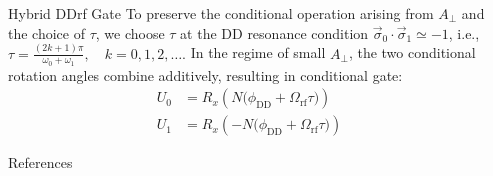 \documentclass[final]{beamer}
\newlength{\sepwidth}
\newlength{\colwidth}
\newcommand{\separatorcolumn}{\begin{column}{\sepwidth}\end{column}}
\begin{document}
\begin{frame}[t]
\begin{columns}[t]
\begin{column}{\colwidth}
\begin{block}{Hybrid DDrf Gate}
    To preserve the conditional operation arising from $A_\perp$ and the choice of $\tau$, we choose $\tau$ at the DD resonance condition $\vec\sigma_0 \cdot \vec{\sigma}_1 \simeq -1$, i.e.,
    $\tau = \frac{(2k + 1)\pi}{\omega_0 + \omega_1}, \quad k = 0, 1, 2, \ldots .$
    In the regime of small $A_\perp$, the two conditional rotation angles combine additively, resulting in conditional gate:
    \begin{align}
      U_0 &= R_x \!\left(N\bigl(\phi_\text{DD} + \Omega_{\text{rf}}\tau\bigr)\right)\\
      U_1 &= R_x \!\left(-N\bigl(\phi_\text{DD} + \Omega_{\text{rf}}\tau\bigr)\right)
    \end{align}
  \end{block}

  \begin{block}{References}

    \nocite{*}
    \footnotesize{}

  \end{block}

\end{column}

\separatorcolumn
\end{columns}
\end{frame}
\end{document}
